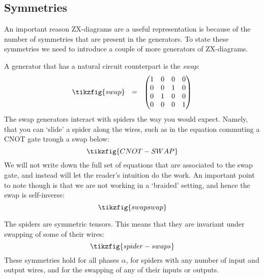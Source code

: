 \documentclass[a4paper,onecolumn,superscriptaddress,11pt,%
				unpublished,%
				allowfontchageintitle,%
				]{quantumarticle}
\begin{document}
\subsection{Symmetries}\label{sec:symmetries}

An important reason ZX-diagrams are a useful representation is because of the number of symmetries that are present in the generators.
To state these symmetries we need to introduce a couple of more generators of ZX-diagrams.

A generator that has a natural circuit counterpart is the \emph{swap}:
\begin{equation}
	\tikzfig{swap} \ \ = \ \ \begin{pmatrix}1&0&0&0\\0&0&1&0\\0&1&0&0\\0&0&0&1\end{pmatrix}
\end{equation}
The swap generators interact with spiders the way you would expect. Namely, that you can `slide' a spider along the wires, such as in the equation commuting a CNOT gate trough a swap below:
\begin{equation}\label{eq:CNOT-SWAP}
\tikzfig{CNOT-SWAP}
\end{equation}
We will not write down the full set of equations that are associated to the swap gate, and instead will let the reader's intuition do the work. An important point to note though is that we are not working in a `braided' setting, and hence the swap is self-inverse:
\begin{equation}
\tikzfig{swapswap}
\end{equation}

The spiders are symmetric tensors. This means that they are invariant under swapping of some of their wires:
\begin{equation}
	\tikzfig{spider-swaps}
\end{equation}
These symmetries hold for all phases $\alpha$, for spiders with any number of input and output wires, and for the swapping of any of their inputs or outputs.
\end{document}
